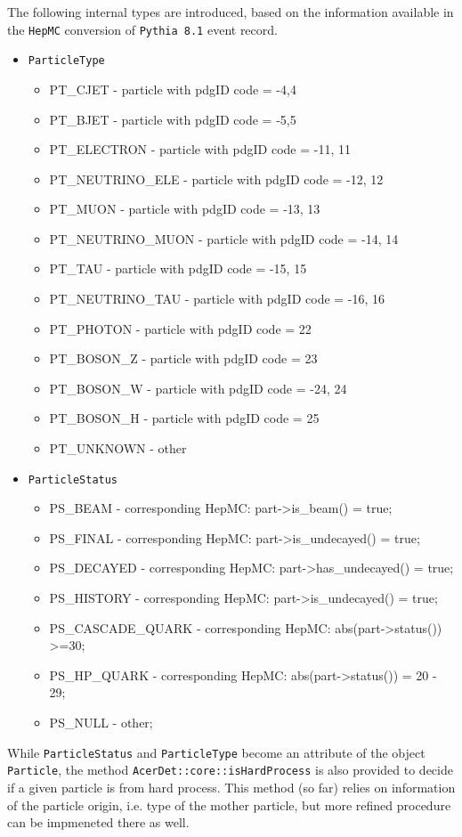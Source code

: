 The following internal types are introduced, based on the information
available in the {\tt HepMC} conversion of {\tt Pythia 8.1} event record.
\begin{itemize}
\item
{\tt ParticleType}
\begin{itemize}
\item
PT\_CJET  - particle with pdgID code = -4,4
\item
PT\_BJET  - particle with pdgID code = -5,5
\item
PT\_ELECTRON  - particle with pdgID code = -11, 11
\item
PT\_NEUTRINO\_ELE  - particle with pdgID code = -12, 12
\item
PT\_MUON  - particle with pdgID code = -13, 13
\item
PT\_NEUTRINO\_MUON  - particle with pdgID code = -14, 14
\item
PT\_TAU  - particle with pdgID code = -15, 15
\item
PT\_NEUTRINO\_TAU  - particle with pdgID code = -16, 16
\item
PT\_PHOTON  - particle with pdgID code = 22
\item
PT\_BOSON\_Z  - particle with pdgID code = 23
\item
PT\_BOSON\_W  - particle with pdgID code = -24, 24
\item
PT\_BOSON\_H  - particle with pdgID code = 25
\item
PT\_UNKNOWN  - other 
\end{itemize}
\item
{\tt ParticleStatus}
\begin{itemize}
\item
PS\_BEAM   - corresponding HepMC: part->is\_beam() = true;
\item
PS\_FINAL  - corresponding HepMC: part->is\_undecayed() = true;
\item
PS\_DECAYED  - corresponding HepMC: part->has\_undecayed() = true;
\item
PS\_HISTORY  - corresponding HepMC: part->is\_undecayed() = true;
\item
PS\_CASCADE\_QUARK  - corresponding HepMC: abs(part->status()) >=30;
\item
PS\_HP\_QUARK  - corresponding HepMC: abs(part->status()) = 20 - 29;
\item
PS\_NULL  - other;
\end{itemize}
\end{itemize}

While {\tt ParticleStatus} and {\tt ParticleType} become an attribute of the 
object  {\tt Particle}, the method {\tt AcerDet::core::isHardProcess} is also
provided to decide if a given particle is from hard process. This method (so far)
relies on information of the particle origin, i.e. type of the mother particle,
but more refined procedure can be impmeneted there as well. 





